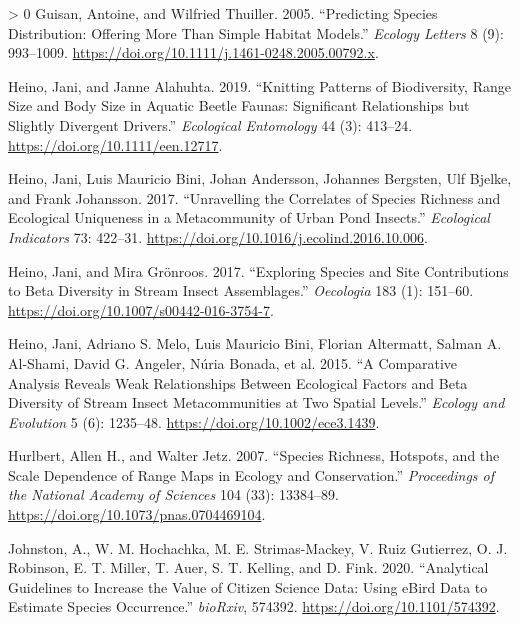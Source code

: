 \documentclass[11pt]{article}
\newlength{\cslhangindent}
\newenvironment{CSLReferences}[3] %
 {%
  \setlength{\parindent}{0pt}
  \ifodd #1 \everypar{\setlength{\hangindent}{\cslhangindent}}\ignorespaces\fi
  \ifnum #2 > 0
  \setlength{\parskip}{#2\baselineskip}
  \fi
 }%
 {}
\begin{document}
\begin{CSLReferences}{1}{0}
\leavevmode\hypertarget{ref-Guisan2005PreSpe}{}%
Guisan, Antoine, and Wilfried Thuiller. 2005. {``Predicting Species
Distribution: Offering More Than Simple Habitat Models.''} \emph{Ecology
Letters} 8 (9): 993--1009.
\url{https://doi.org/10.1111/j.1461-0248.2005.00792.x}.

\leavevmode\hypertarget{ref-Heino2019KniPat}{}%
Heino, Jani, and Janne Alahuhta. 2019. {``Knitting Patterns of
Biodiversity, Range Size and Body Size in Aquatic Beetle Faunas:
Significant Relationships but Slightly Divergent Drivers.''}
\emph{Ecological Entomology} 44 (3): 413--24.
\url{https://doi.org/10.1111/een.12717}.

\leavevmode\hypertarget{ref-Heino2017UnrCor}{}%
Heino, Jani, Luis Mauricio Bini, Johan Andersson, Johannes Bergsten, Ulf
Bjelke, and Frank Johansson. 2017. {``Unravelling the Correlates of
Species Richness and Ecological Uniqueness in a Metacommunity of Urban
Pond Insects.''} \emph{Ecological Indicators} 73: 422--31.
\url{https://doi.org/10.1016/j.ecolind.2016.10.006}.

\leavevmode\hypertarget{ref-Heino2017ExpSpe}{}%
Heino, Jani, and Mira Grönroos. 2017. {``Exploring Species and Site
Contributions to Beta Diversity in Stream Insect Assemblages.''}
\emph{Oecologia} 183 (1): 151--60.
\url{https://doi.org/10.1007/s00442-016-3754-7}.

\leavevmode\hypertarget{ref-Heino2015ComAna}{}%
Heino, Jani, Adriano S. Melo, Luis Mauricio Bini, Florian Altermatt,
Salman A. Al-Shami, David G. Angeler, Núria Bonada, et al. 2015. {``A
Comparative Analysis Reveals Weak Relationships Between Ecological
Factors and Beta Diversity of Stream Insect Metacommunities at Two
Spatial Levels.''} \emph{Ecology and Evolution} 5 (6): 1235--48.
\url{https://doi.org/10.1002/ece3.1439}.

\leavevmode\hypertarget{ref-Hurlbert2007SpeRic}{}%
Hurlbert, Allen H., and Walter Jetz. 2007. {``Species Richness,
Hotspots, and the Scale Dependence of Range Maps in Ecology and
Conservation.''} \emph{Proceedings of the National Academy of Sciences}
104 (33): 13384--89. \url{https://doi.org/10.1073/pnas.0704469104}.

\leavevmode\hypertarget{ref-Johnston2020AnaGui}{}%
Johnston, A., W. M. Hochachka, M. E. Strimas-Mackey, V. Ruiz Gutierrez,
O. J. Robinson, E. T. Miller, T. Auer, S. T. Kelling, and D. Fink. 2020.
{``Analytical Guidelines to Increase the Value of Citizen Science Data:
Using eBird Data to Estimate Species Occurrence.''} \emph{bioRxiv},
574392. \url{https://doi.org/10.1101/574392}.


\end{CSLReferences}
\end{document}
